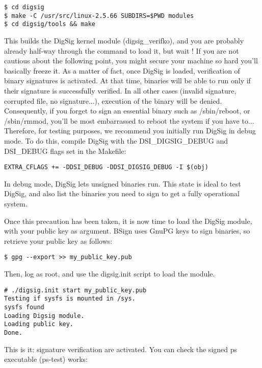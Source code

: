 \documentclass{article}
\begin{document}
\small
\begin{verbatim} 
$ cd digsig
$ make -C /usr/src/linux-2.5.66 SUBDIRS=$PWD modules
$ cd digsig/tools && make
\end{verbatim} 
\normalsize

This builds the DigSig kernel module (digsig\_verifko), and you are
probably already half-way through the command to load it, but wait !
If you are not cautious about the following point, you might secure
your machine so hard you'll basically freeze it. As a matter of fact,
once DigSig is loaded, verification of binary signatures is activated.
At that time, binaries will be able to run only if their signature is
successfully verified. In all other cases (invalid signature,
corrupted file, no signature...), execution of the binary will be
denied. Consequently, if you forget to sign an essential binary such
as /sbin/reboot, or /sbin/rmmod, you'll be most embarrassed to reboot
the system if you have to...  Therefore, for testing purposes, we
recommend you initially run DigSig in debug mode. To do this, compile
DigSig with the DSI\_DIGSIG\_DEBUG and DSI\_DEBUG flags set in the
Makefile:

\small
\begin{verbatim} 
EXTRA_CFLAGS += -DDSI_DEBUG -DDSI_DIGSIG_DEBUG -I $(obj)
\end{verbatim} 
\normalsize

In debug mode, DigSig lets unsigned binaries run. This state is ideal
to test DigSig, and also list the binaries you need to sign to get a
fully operational system.

Once this precaution has been taken, it is now time to load the DigSig
module, with your public key as argument. BSign uses GnuPG keys to
sign binaries, so retrieve your public key as follows:

\small
\begin{verbatim} 
$ gpg --export >> my_public_key.pub 
\end{verbatim}
\normalsize

Then, log as root, and use the digsig.init script to load the module.

\small
\begin{verbatim} 
# ./digsig.init start my_public_key.pub
Testing if sysfs is mounted in /sys.
sysfs found
Loading Digsig module.
Loading public key.
Done.
\end{verbatim} 
\normalsize

This is it: signature verification are activated. You can check the 
signed ps executable (ps-test) works:
\end{document}

